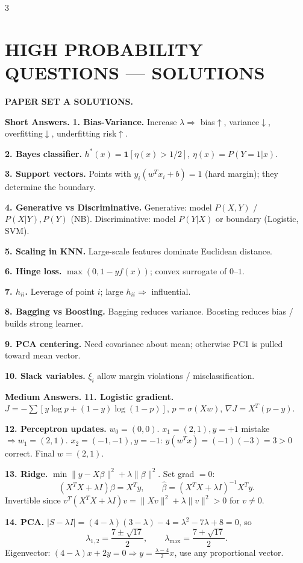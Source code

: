\documentclass[8pt,fleqn]{extarticle}
\begin{document}
\begin{multicols}{3}
\section*{HIGH PROBABILITY QUESTIONS --- SOLUTIONS}

\textbf{PAPER SET A SOLUTIONS.}

\textbf{Short Answers.}
\textbf{1. Bias-Variance.} Increase $\lambda\Rightarrow$ bias$\uparrow$, variance$\downarrow$, overfitting$\downarrow$, underfitting risk$\uparrow$.

\textbf{2. Bayes classifier.} $h^*(x)=\mathbf{1}[\eta(x)>1/2]$, $\eta(x)=P(Y=1|x)$.

\textbf{3. Support vectors.} Points with $y_i(w^Tx_i+b)=1$ (hard margin); they determine the boundary.

\textbf{4. Generative vs Discriminative.} Generative: model $P(X,Y)$ / $P(X|Y),P(Y)$ (NB). Discriminative: model $P(Y|X)$ or boundary (Logistic, SVM).

\textbf{5. Scaling in KNN.} Large-scale features dominate Euclidean distance.

\textbf{6. Hinge loss.} $\max(0,1-yf(x))$; convex surrogate of $0$--$1$.

\textbf{7. $h_{ii}$.} Leverage of point $i$; large $h_{ii}\Rightarrow$ influential.

\textbf{8. Bagging vs Boosting.} Bagging reduces variance. Boosting reduces bias / builds strong learner.

\textbf{9. PCA centering.} Need covariance about mean; otherwise PC1 is pulled toward mean vector.

\textbf{10. Slack variables.} $\xi_i$ allow margin violations / misclassification.

\textbf{Medium Answers.}
\textbf{11. Logistic gradient.} $J=-\sum[y\log p+(1-y)\log(1-p)]$, $p=\sigma(Xw)$, $\nabla J=X^T(p-y)$.

\textbf{12. Perceptron updates.} $w_0=(0,0)$. $x_1=(2,1),y=+1$ mistake $\Rightarrow w_1=(2,1)$. $x_2=(-1,-1),y=-1$: $y(w^Tx)=(-1)(-3)=3>0$ correct. Final $w=(2,1)$.

\textbf{13. Ridge.} $\min \|y-X\beta\|^2+\lambda\|\beta\|^2$. Set grad $=0$:
\[
(X^TX+\lambda I)\beta=X^Ty,\qquad \hat\beta=(X^TX+\lambda I)^{-1}X^Ty.
\]
Invertible since $v^T(X^TX+\lambda I)v=\|Xv\|^2+\lambda\|v\|^2>0$ for $v\neq0$.

\textbf{14. PCA.} $|S-\lambda I|=(4-\lambda)(3-\lambda)-4=\lambda^2-7\lambda+8=0$, so
\[
\lambda_{1,2}=\frac{7\pm\sqrt{17}}{2},\qquad \lambda_{\max}=\frac{7+\sqrt{17}}{2}.
\]
Eigenvector: $(4-\lambda)x+2y=0\Rightarrow y=\frac{\lambda-4}{2}x$, use any proportional vector.


\end{multicols}
\end{document}
